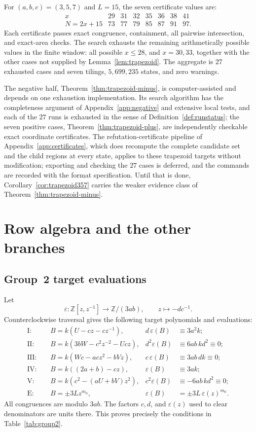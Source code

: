 \documentclass[11pt]{amsart}
\theoremstyle{definition}
\theoremstyle{remark}
\newcommand{\Z}{\mathbb Z}
\begin{document}
For $(a,b,c)=(3,5,7)$ and $L=15$, the seven certificate values are:
\[
\begin{array}{c|rrrrrrr}
x&29&31&32&35&36&38&41\\
\hline
N=2x+15&73&77&79&85&87&91&97.
\end{array}
\]
Each certificate passes exact congruence, containment, all pairwise
intersection, and exact-area checks.  The search exhausts the remaining
arithmetically possible values in the finite window: all possible $x\le28$,
and $x=30,33$, together with the other cases not supplied by
Lemma~\ref{lem:trapezoid}.  The aggregate is $27$ exhausted cases and seven
tilings, $5{,}699{,}235$ states, and zero warnings.

The negative half, Theorem~\ref{thm:trapezoid-minus}, is computer-assisted
and depends on one exhaustion implementation.  Its search algorithm has the
completeness argument of Appendix~\ref{app:negative} and extensive local
tests, and each of the $27$ runs is exhausted in the sense of
Definition~\ref{def:runstatus}; the seven positive cases,
Theorem~\ref{thm:trapezoid-plus}, are independently checkable exact
coordinate certificates.  The refutation-certificate pipeline of
Appendix~\ref{app:certificates}, which does recompute the complete candidate
set and the child regions at every state, applies to these trapezoid targets
without modification; exporting and checking the $27$ cases is deferred, and
the commands are recorded with the format specification.  Until that is done,
Corollary~\ref{cor:trapezoid357} carries the weaker evidence class of
Theorem~\ref{thm:trapezoid-minus}.

\section{Row algebra and the other branches}\label{app:rowalgebra}

\subsection{Group~2 target evaluations}

Let
\[
 \varepsilon:\Z[z,z^{-1}]\longrightarrow\Z/(3ab),
 \qquad z\longmapsto-dc^{-1}.
\]
Counterclockwise traversal gives the following target polynomials and
evaluations:
\begin{align*}
\mathrm{I}:\quad&
 B=k(U-cz-cz^{-1}),&
 d\,\varepsilon(B)&\equiv3a^2k;\\
\mathrm{II}:\quad&
 B=k(3bW-c^2z^{-2}-Ucz),&
 d^2\varepsilon(B)&\equiv6ab\,kd^2\equiv0;\\
\mathrm{III}:\quad&
 B=k(Wc-acz^2-bVz),&
 c\,\varepsilon(B)&\equiv3ab\,dk\equiv0;\\
\mathrm{IV}:\quad&
 B=k((2a+b)-cz),&
 \varepsilon(B)&\equiv3ak;\\
\mathrm{V}:\quad&
 B=k(c^2-(aU+bV)z^2),&
 c^2\varepsilon(B)&\equiv-6ab\,kd^2\equiv0;\\
\mathrm{E}:\quad&
 B=\pm3Lz^{m_0},&
 \varepsilon(B)&=\pm3L\,\varepsilon(z)^{m_0}.
\end{align*}
All congruences are modulo $3ab$.  The factors $c,d$, and
$\varepsilon(z)$ used to clear denominators are units there.
This proves precisely the conditions in Table~\ref{tab:group2}.
\end{document}
